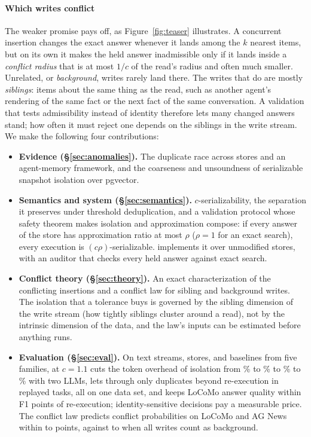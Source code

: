 \documentclass[sigconf, nonacm, review]{acmart}
\begin{document}
\paragraph{Which writes conflict}
The weaker promise pays off, as Figure~\ref{fig:teaser} illustrates. A concurrent insertion changes the exact answer whenever
it lands among the $k$ nearest items, but on its own it makes the held answer
inadmissible only if it lands inside a \emph{conflict radius} that is
at most $1/c$ of the read's radius and often much smaller. Unrelated,
or \emph{background}, writes rarely land there. The writes that do are
mostly \emph{siblings}: items about the same thing as the read, such as
another agent's rendering of the same fact or the next fact of the same
conversation. A validation that tests admissibility instead of identity
therefore lets many changed answers stand; how often it must reject
one depends on the siblings in the write stream. We make the following four contributions:
\begin{itemize}
\item \textbf{Evidence (\S\ref{sec:anomalies}).} The duplicate race
  across stores and an agent-memory framework, and the coarseness and
  unsoundness of serializable snapshot isolation over pgvector.
\item \textbf{Semantics and system (\S\ref{sec:semantics}).}
  $c$-serializability, the separation it preserves under threshold
  deduplication, and a validation protocol whose safety theorem makes
  isolation and approximation compose: if every answer of the store has
  approximation ratio at most $\rho$ ($\rho=1$ for an exact search), every
  execution is $(c\rho)$-serializable. \sys{} implements it
  over unmodified stores, with an auditor that checks every held
  answer against exact search.
\item \textbf{Conflict theory (\S\ref{sec:theory}).} An exact
  characterization of the conflicting insertions and a conflict law for
  sibling and background writes. The isolation that a tolerance buys is
  governed by the sibling dimension of the write stream (how tightly
  siblings cluster around a read), not by the intrinsic dimension of
  the data, and the law's inputs can be estimated before anything runs.
\item \textbf{Evaluation (\S\ref{sec:eval}).} On
   text streams,  stores, and
   baselines from five families, \sys{} at
  $c=1.1$ cuts the token overhead of isolation from
  \% to \% to
  \% to \% with two LLMs, lets through only  duplicates beyond re-execution in
   replayed tasks, all on one data set, and keeps LoCoMo answer
  quality within  F1 points of re-execution; identity-sensitive decisions pay
  a measurable price. The conflict law predicts conflict probabilities
  on LoCoMo and AG News within  to  points,
  against  to  when all writes count as
  background.
\end{itemize}
\end{document}

